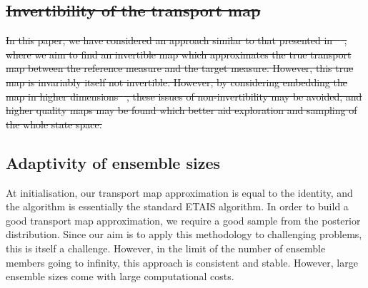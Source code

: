 \documentclass[final]{siamltex}
\providecommand{\DIFdel}[1]{{\protect\color{red}\sout{#1}}}                      %
\providecommand{\DIFdelbegin}{} %
\providecommand{\DIFdelend}{} %
\newcommand{\DIFscaledelfig}{0.5}
\newlength{\DIFdelgraphicswidth} %
\newlength{\DIFdelgraphicsheight} %
\newcommand{\DIFdelincludegraphics}[2][]{%
\sbox{\DIFdelgraphicsbox}{\DIFOincludegraphics[#1]{#2}}%
\settoboxwidth{\DIFdelgraphicswidth}{\DIFdelgraphicsbox} %
\settoboxtotalheight{\DIFdelgraphicsheight}{\DIFdelgraphicsbox} %
\scalebox{\DIFscaledelfig}{%
\parbox[b]{\DIFdelgraphicswidth}{\usebox{\DIFdelgraphicsbox}\\[-\baselineskip] \rule{\DIFdelgraphicswidth}{0em}}\llap{\resizebox{\DIFdelgraphicswidth}{\DIFdelgraphicsheight}{%
\setlength{\unitlength}{\DIFdelgraphicswidth}%
\begin{picture}(1,1)%
\thicklines\linethickness{2pt} %
{\color[rgb]{1,0,0}\put(0,0){\framebox(1,1){}}}%
{\color[rgb]{1,0,0}\put(0,0){\line( 1,1){1}}}%
{\color[rgb]{1,0,0}\put(0,1){\line(1,-1){1}}}%
\end{picture}%
}\hspace*{3pt}}} %
} %
\DeclareRobustCommand{\DIFdelbegin}{\DIFOdelbegin \let\includegraphics\DIFdelincludegraphics} %
\DeclareRobustCommand{\DIFdelend}{\DIFOaddend \let\includegraphics\DIFOincludegraphics} %
\begin{document}
\DIFdelbegin \subsection{\DIFdel{Invertibility of the transport map}}
\addtocounter{subsection}{-1}%
\DIFdel{In this paper, we have considered an approach similar to that
presented in \mbox{%
\cite{parno2014transport}}\hspace{0pt}%
, where we aim to find an
invertible map which approximates the true transport map between the
reference measure and the target measure. However, this true map is
invariably itself not invertible. However, by considering embedding
the map in higher dimensions\mbox{%
\cite{whitney_self-intersections_1994,nash1956imbedding,takens_detecting_1981}}\hspace{0pt}%
, these issues of non-invertibility may be
avoided, and higher quality maps may be found which better aid
exploration and sampling of the whole state space.
}\DIFdelend %

\subsection{Adaptivity of ensemble sizes}
At initialisation, our transport map approximation is equal to the
identity, and the algorithm is essentially the standard ETAIS
algorithm. In order to build a good transport map approximation, we
require a good sample from the posterior distribution. Since our aim
is to apply this methodology to challenging problems, this is itself a
challenge. However, in the limit of the number of ensemble members
going to infinity, this approach is consistent and stable. However,
large ensemble sizes come with large computational costs.
\end{document}
